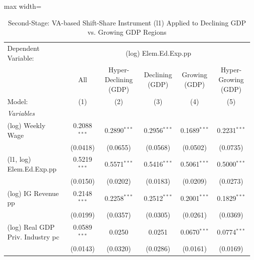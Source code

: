 \documentclass[
  10pt,
]{article}
\begin{document}
\begin{table}[htbp]
   \caption{\label{tbl_gdp_ss_gdp_subsamples} Second-Stage: VA-based Shift-Share Instrument (l1) Applied to Declining GDP vs. Growing GDP Regions}
   \centering
   \begin{adjustbox}{max width=\textwidth}
      \begin{tabular}{lccccc}
         \tabularnewline \midrule \midrule
         Dependent Variable: & \multicolumn{5}{c}{(log) Elem.Ed.Exp.pp}\\
                                                        & All                    & Hyper-Declining (GDP) & Declining (GDP)       & Growing (GDP)         & Hyper-Growing (GDP) \\   
         Model:                                         & (1)                    & (2)                   & (3)                   & (4)                   & (5)\\  
         \midrule
         \emph{Variables}\\
         (log) Weekly Wage                              & 0.2088$^{***}$         & 0.2890$^{***}$        & 0.2956$^{***}$        & 0.1689$^{***}$        & 0.2231$^{***}$\\   
                                                        & (0.0418)               & (0.0655)              & (0.0568)              & (0.0502)              & (0.0735)\\   
         (l1, log) Elem.Ed.Exp.pp                       & 0.5219$^{***}$         & 0.5571$^{***}$        & 0.5416$^{***}$        & 0.5061$^{***}$        & 0.5000$^{***}$\\   
                                                        & (0.0150)               & (0.0202)              & (0.0183)              & (0.0209)              & (0.0273)\\   
         (log) IG Revenue pp                            & 0.2148$^{***}$         & 0.2258$^{***}$        & 0.2512$^{***}$        & 0.2001$^{***}$        & 0.1829$^{***}$\\   
                                                        & (0.0199)               & (0.0357)              & (0.0305)              & (0.0261)              & (0.0369)\\   
         (log) Real GDP Priv. Industry pc               & 0.0589$^{***}$         & 0.0250                & 0.0251                & 0.0670$^{***}$        & 0.0774$^{***}$\\   
                                                        & (0.0143)               & (0.0320)              & (0.0286)              & (0.0161)              & (0.0169)\\   

\end{tabular}
\end{adjustbox}
\end{table}
\end{document}
